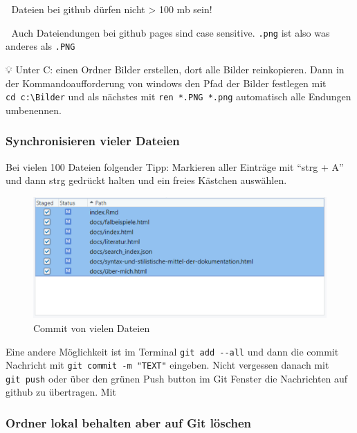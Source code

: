 \documentclass[
]{article}
\begin{document}
🚨 Dateien bei github dürfen nicht \textgreater{} 100 mb sein!

🚨 Auch Dateiendungen bei github pages sind case sensitive. \texttt{.png} ist also was anderes als \texttt{.PNG}

💡 Unter C: einen Ordner Bilder erstellen, dort alle Bilder reinkopieren. Dann in der Kommandoaufforderung von windows den Pfad der Bilder festlegen mit \texttt{cd\ c:\textbackslash{}Bilder} und als nächstes mit \texttt{ren\ *.PNG\ *.png} automatisch alle Endungen umbenennen.

\hypertarget{synchronisieren-vieler-dateien}{%
\subsubsection{Synchronisieren vieler Dateien}\label{synchronisieren-vieler-dateien}}

Bei vielen 100 Dateien folgender Tipp: Markieren aller Einträge mit ``strg + A'' und dann strg gedrückt halten und ein freies Kästchen auswählen. 🎉

\begin{figure}

{\centering \includegraphics[width=1\linewidth]{images/074} 

}

\caption{Commit von vielen Dateien}\label{fig:unnamed-chunk-303}
\end{figure}

Eine andere Möglichkeit ist im Terminal \texttt{git\ add\ -\/-all} und dann die commit Nachricht mit \texttt{git\ commit\ -m\ "TEXT"} eingeben. Nicht vergessen danach mit \texttt{git\ push} oder über den grünen Push button im Git Fenster die Nachrichten auf github zu übertragen. Mit

\hypertarget{ordner-lokal-behalten-aber-auf-git-luxf6schen}{%
\subsubsection{Ordner lokal behalten aber auf Git löschen}\label{ordner-lokal-behalten-aber-auf-git-luxf6schen}}
\end{document}
